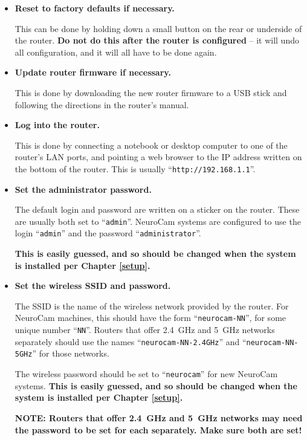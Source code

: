 \begin{itemize}
%
\item \textbf{Reset to factory defaults if necessary.}

This can be done by holding down a small button on the rear or underside of
the router. \textbf{Do not do this after the router is configured} -- it will
undo all configuration, and it will all have to be done again.

\item \textbf{Update router firmware if necessary.}

This is done by downloading the new router firmware to a USB stick and
following the directions in the router's manual.

\item \textbf{Log into the router.}

This is done by connecting a notebook or desktop computer to one of the
router's LAN ports, and pointing a web browser to the IP address written on
the bottom of the router. This is usually ``\verb+http://192.168.1.1+''.

\item \textbf{Set the administrator password.}

The default login and password are written on a sticker on the router. These
are usually both set to ``\verb+admin+''. NeuroCam systems are configured to
use the login ``\verb+admin+'' and the password ``\verb+administrator+''.

\textbf{This is easily guessed, and so should be changed when the system is
installed per Chapter \ref{setup}.}

\item \textbf{Set the wireless SSID and password.}

The SSID is the name of the wireless network provided by the router. For
NeuroCam machines, this should have the form ``\verb+neurocam-NN+'', for
some unique number ``\verb+NN+''. Routers that offer 2.4~GHz and 5~GHz
networks separately should use the names ``\verb+neurocam-NN-2.4GHz+'' and
``\verb+neurocam-NN-5GHz+'' for those networks.

The wireless password should be set to ``\verb+neurocam+'' for new NeuroCam
systems. \textbf{This is easily guessed, and so should be changed when the
system is installed per Chapter \ref{setup}.}

\textbf{NOTE: Routers that offer 2.4~GHz and 5~GHz networks may need the
password to be set for each separately. Make sure both are set!}


\end{itemize}
